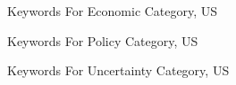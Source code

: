 \documentclass[12pt]{beamer}
\begin{document}
\begin{frame}{Keywords For Economic Category, US}
\begin{table}[H]
\renewcommand\arraystretch{0.4}
\label{Taiwan policy keywords}
\begin{adjustwidth}{-0.0cm}{}
\begin{center}
\setlength{\tabcolsep}{0.5pt}
{
    \fontsize{8}{8} \selectfont
    
}
\end{center}
\end{adjustwidth}
\end{table}
\end{frame}


\begin{frame}{Keywords For Policy Category, US}
\begin{table}[H]
\renewcommand\arraystretch{1.}
\label{Taiwan policy keywords}
\begin{adjustwidth}{-0.0cm}{}
\begin{center}
\setlength{\tabcolsep}{13pt}
{
    \fontsize{8}{8} \selectfont
    
}
\end{center}
\end{adjustwidth}
\end{table}
\end{frame}


\begin{frame}{Keywords For Uncertainty Category, US}
\begin{table}[H]
\renewcommand\arraystretch{1.3}
\label{Taiwan policy keywords}
\begin{adjustwidth}{-0.0cm}{}
\begin{center}
\setlength{\tabcolsep}{12pt}
{
    \fontsize{8}{8} \selectfont
    
}
\end{center}
\end{adjustwidth}
\end{table}
\end{frame}
\end{document}
